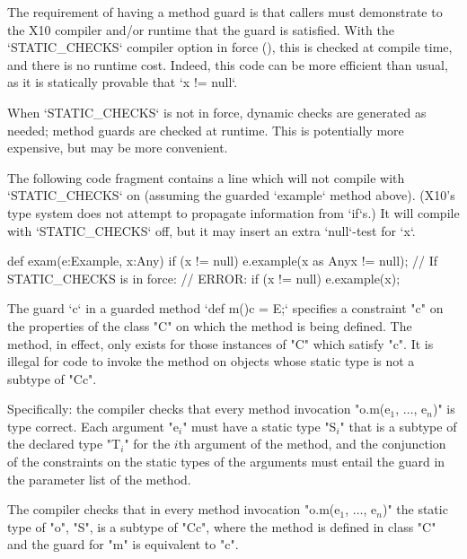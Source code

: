 The requirement of having a method guard 
is that callers must demonstrate to
the X10
compiler and/or runtime that the guard is satisfied.  
With the \xcd`STATIC_CHECKS` compiler option in force (), this is
checked at compile time, and there is no runtime cost.
Indeed, this code can be more efficient than usual, as it is statically provable that \xcd`x != null`.

When \xcd`STATIC_CHECKS` is not in force, dynamic checks are generated as
needed; method guards are checked at runtime. This is potentially more
expensive, but may be more convenient. 

\begin{ex}
The following code fragment contains a line which will not compile 
with \xcd`STATIC_CHECKS` on (assuming the guarded \xcd`example` method above).  (X10's type system does not attempt to propagate 
information from \xcd`if`s.)  It will compile with \xcd`STATIC_CHECKS` off,
but it may insert an extra \xcd`null`-test for \xcd`x`.  
\begin{xten}
  def exam(e:Example, x:Any) {
    if (x != null) 
       e.example(x as Any{x != null});
       // If STATIC_CHECKS is in force: 
       // ERROR: if (x != null) e.example(x); 
  }
\end{xten}
\end{ex}


The guard \xcd`{c}` 
in a guarded method 
\xcd`def m(){c} = E;`
specifies a constraint \xcd"c" on the
properties of the class \xcd"C" on which the method is being defined. The
method, in effect, only exists  for those instances of \xcd"C" which satisfy
\xcd"c".  It is 
illegal for code to invoke the method on objects whose static type is
not a subtype of \xcd"C{c}".

Specifically: 
    the compiler checks that every method invocation
    \xcdmath"o.m(e$_1$, $\dots$, e$_n$)"
    is type correct. Each argument
    \xcdmath"e$_i$" must have a
    static type \xcdmath"S$_i$" that is a subtype of the declared type
    \xcdmath"T$_i$" for the $i$th
    argument of the method, and the conjunction of the constraints on the
    static types 
    of the arguments must entail the guard in the parameter list
    of the method.

    The compiler checks that in every method invocation
    \xcdmath"o.m(e$_1$, $\dots$, e$_n$)"
    the static type of \xcd"o", \xcd"S", is a subtype of \xcd"C{c}", where the method
    is defined in class \xcd"C" and the guard for \xcd"m" is equivalent to
    \xcd"c".

